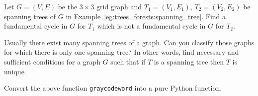\begin{problem}
\item Let $G=(V, E)$ be the $3\times 3$ grid graph and $T_1=(V_1,E_1)$,
  $T_2=(V_2,E_2)$ be spanning trees of $G$ in
  Example~\ref{eg:trees_forests:spanning_tree}. Find a fundamental
  cycle in $G$ for $T_1$ which is not a fundamental cycle in $G$ for
  $T_2$.

\item Usually there exist many spanning trees of a graph. Can you
  classify those graphs for which there is only one spanning tree? In
  other words, find necessary and sufficient conditions for a graph
  $G$ such that if $T$ is a spanning tree then $T$ is unique.

\item Convert the above function {\tt graycodeword} into a pure Python
  function.
\end{problem}
